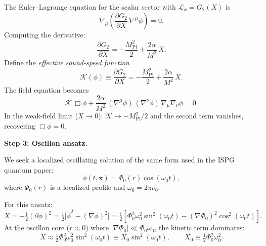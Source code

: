 \documentclass[11pt]{article}
\begin{document}
The Euler--Lagrange equation for the scalar sector with
$\mathcal{L}_\phi = G_2(X)$ is
\begin{equation}
  \nabla_\mu\!\left(
    \frac{\partial G_2}{\partial X}\,
    \nabla^\mu\phi
  \right) = 0.
  \label{eq:G2_eom_general}
\end{equation}
Computing the derivative:
\begin{equation}
  \frac{\partial G_2}{\partial X}
  = -\frac{M_{\mathrm{Pl}}^2}{2}
  + \frac{2\alpha}{M^2}\,X.
  \label{eq:dG2dX}
\end{equation}
Define the \emph{effective sound-speed function}
\begin{equation}
  \mathcal{K}(\phi)
  \equiv \frac{\partial G_2}{\partial X}
  = -\frac{M_{\mathrm{Pl}}^2}{2}
  + \frac{2\alpha}{M^2}\,X.
  \label{eq:K_def}
\end{equation}
The field equation becomes
\begin{equation}
  \mathcal{K}\,\Box\phi
  + \frac{2\alpha}{M^2}\,
  (\nabla^\mu\phi)\,(\nabla^\nu\phi)\,
  \nabla_\mu\nabla_\nu\phi = 0.
  \label{eq:full_eom}
\end{equation}
In the weak-field limit ($X \to 0$):
$\mathcal{K} \to -M_{\mathrm{Pl}}^2/2$ and the second
term vanishes, recovering $\Box\phi = 0$.

\medskip
\textbf{Step 3: Oscillon ansatz.}

We seek a localized oscillating solution of the same form
used in the ISPG quantum paper:
\begin{equation}
  \phi(t,\mathbf{x}) = \Phi_0(r)\cos(\omega_0 t),
  \label{eq:oscillon_ansatz}
\end{equation}
where $\Phi_0(r)$ is a localized profile and
$\omega_0 = 2\pi\nu_0$.

For this ansatz:
\begin{equation}
  X = -\tfrac{1}{2}(\partial\phi)^2
  = \tfrac{1}{2}\bigl[
    \dot\phi^2 - (\nabla\phi)^2
  \bigr]
  = \tfrac{1}{2}\left[
    \Phi_0^2\omega_0^2\sin^2(\omega_0 t)
    - (\nabla\Phi_0)^2\cos^2(\omega_0 t)
  \right].
  \label{eq:X_oscillon}
\end{equation}
At the oscillon core ($r \approx 0$) where
$|\nabla\Phi_0| \ll \Phi_0\omega_0$, the kinetic term
dominates:
\begin{equation}
  X \approx \tfrac{1}{2}\Phi_0^2\omega_0^2
  \sin^2(\omega_0 t)
  \equiv X_0\sin^2(\omega_0 t),
  \qquad
  X_0 \equiv \tfrac{1}{2}\Phi_0^2\omega_0^2.
  \label{eq:X0_def}
\end{equation}
\end{document}
